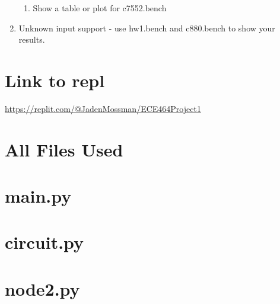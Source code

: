 \documentclass{article}
\begin{document}
\begin{enumerate}[label=\Alph*.]
\begin{enumerate}[label=\roman*.]
                \item Show a table or plot for c7552.bench
                
            \end{enumerate}
            
            \item Unknown input support - use hw1.bench and c880.bench to show your results.
        \end{enumerate}

    \section{Link to repl}
        \url{https://replit.com/@JadenMossman/ECE464Project1}
    
    \newpage
    \section{All Files Used}
        \newcommand{\FileUsed}[1]{\section*{ #1 }}
        \FileUsed{main.py}
        \FileUsed{circuit.py}
        \FileUsed{node2.py}
\end{document}
